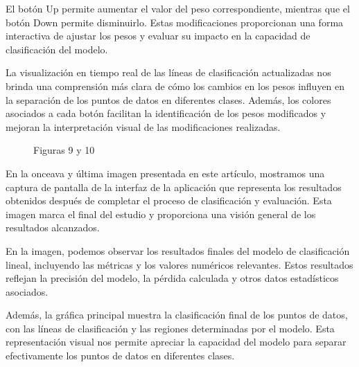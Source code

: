\documentclass[twoside,10pt]{article}
\numberwithin{equation}{section}
\begin{document}
El botón Up permite aumentar el valor del peso correspondiente, mientras que el botón Down permite disminuirlo. Estas modificaciones proporcionan una forma interactiva de ajustar los pesos y evaluar su impacto en la capacidad de clasificación del modelo.

La visualización en tiempo real de las líneas de clasificación actualizadas nos brinda una comprensión más clara de cómo los cambios en los pesos influyen en la separación de los puntos de datos en diferentes clases. Además, los colores asociados a cada botón facilitan la identificación de los pesos modificados y mejoran la interpretación visual de las modificaciones realizadas.


\begin{figure}[ht]
    \centering
    \hspace{1cm}
    \caption{Figuras 9 y 10}
\end{figure}

En la onceava y última imagen presentada en este artículo, mostramos una captura de pantalla de la interfaz de la aplicación que representa los resultados obtenidos después de completar el proceso de clasificación y evaluación. Esta imagen marca el final del estudio y proporciona una visión general de los resultados alcanzados.

En la imagen, podemos observar los resultados finales del modelo de clasificación lineal, incluyendo las métricas y los valores numéricos relevantes. Estos resultados reflejan la precisión del modelo, la pérdida calculada y otros datos estadísticos asociados.

Además, la gráfica principal muestra la clasificación final de los puntos de datos, con las líneas de clasificación y las regiones determinadas por el modelo. Esta representación visual nos permite apreciar la capacidad del modelo para separar efectivamente los puntos de datos en diferentes clases.
\end{document}

